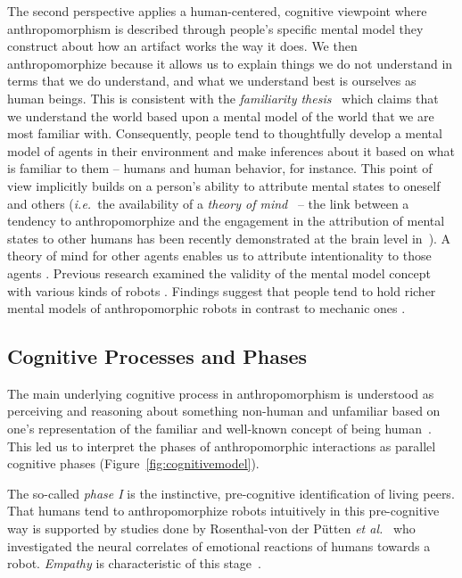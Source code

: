 \documentclass{sig-alternate-2013}
\newcommand{\ie}{{\textit{i.e.~}}}
\begin{document}
The second perspective applies a human-centered, cognitive viewpoint where
anthropomorphism is described through people's specific mental model they
construct about how an artifact works the way it does.  We then
anthropomorphize because it allows us to explain things we do not understand in
terms that we do understand, and what we understand best is ourselves as human
beings. This is consistent with the \emph{familiarity
thesis}~\cite{hegel_understanding_2008} which claims that we understand the
world based upon a mental model of the world that we are most familiar with.
Consequently, people tend to thoughtfully develop a mental model of agents in
their environment and make inferences about it based on what is familiar to
them -- humans and human behavior, for instance.  This point of view implicitly
builds on a person's ability to attribute mental states to oneself and others
(\ie the availability of a \emph{theory of mind}~\cite{premack1978does} -- the
link between a tendency to anthropomorphize and the engagement in the
attribution of mental states to other humans has been recently demonstrated at
the brain level in~\cite{cullen2013individual}). A theory of mind for other
agents enables us to attribute intentionality to those agents
\cite{leslie_pretense_1987,admoni_multi-category_2012}. Previous research
examined the validity of the mental model concept with various kinds of robots
\cite{schmitz_concepts_2011,kiesler_mental_2002}. Findings suggest that people
tend to hold richer mental models of anthropomorphic robots in contrast to
mechanic ones \cite{kiesler_mental_2002}.


\subsection*{Cognitive Processes and Phases}

The main underlying cognitive process in anthropomorphism is understood as
perceiving and reasoning about something non-human and unfamiliar based on one's
representation of the familiar and well-known concept of being
human~\cite{epley_when_2008}. This led us to interpret the phases of
anthropomorphic interactions as parallel cognitive phases
(Figure~\ref{fig:cognitivemodel}).

The so-called \emph{phase I} is the instinctive, pre-cognitive identification of
living peers. That humans tend to anthropomorphize robots intuitively in this
pre-cognitive way
is supported by studies done by Rosenthal-von der Pütten
\textit{et al.}~\cite{rosenthal-vonderputten_experimental_2013} who investigated
the neural correlates of emotional reactions of humans towards a robot. {\it
Empathy} is characteristic of this stage~\cite{rosenthalvonderPutten2013neural}.
\end{document}
